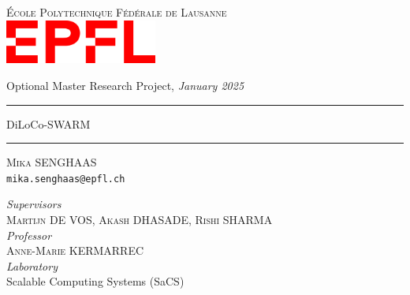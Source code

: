 \documentclass{article}
\begin{document}
\begin{titlepage}
\begin{center}
    \Large{\textsc{École Polytechnique Fédérale de Lausanne}}\\
    \vspace{1cm}
    \includegraphics[width=5cm]{figures/epfl.png}
    \vspace{1cm}
    
    \large{Optional Master Research Project, \textit{January 2025}}\\
    
    \vspace{1cm}
    \rule{\textwidth}{1pt}\vspace{15pt}
    \Huge{DiLoCo-SWARM}
    \rule{\textwidth}{1pt}
    
    \vspace{1cm}
    
    \large{\textsc{Mika SENGHAAS}\\\texttt{mika.senghaas@epfl.ch}}
    
    \large{
      \textit{Supervisors}\\
      \textsc{Martijn DE VOS}, \textsc{Akash DHASADE}, \textsc{Rishi SHARMA}}\\
      \vspace{0.5cm}
      \textit{Professor}\\
      \textsc{Anne-Marie KERMARREC}\\
      \vspace{0.5cm}
      \large{\textit{Laboratory}\\
      Scalable Computing Systems (SaCS)\\
    }
\end{center}
\end{titlepage}

\printAffiliationsAndNotice{}
\end{document}
